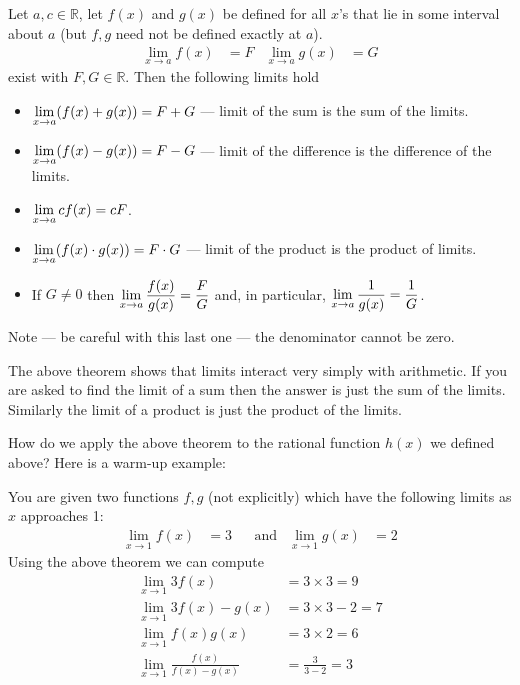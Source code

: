 \begin{theorem}\label{thm arith lim}
  Let $a,c \in \mathbb{R}$, let $f(x)$ and $g(x)$ be defined for all $x$'s that lie in
some interval about $a$ (but $f,g$ need not be defined exactly at $a$).
 \begin{align*}
  \lim_{x \to a} f(x)&=F & \lim_{x \to a} g(x) &=G
\end{align*}
  exist with $F,G \in \mathbb{R}$. Then the following limits hold
\begin{itemize}
 \item $\displaystyle \lim_{x \to a} ( f(x) + g(x) ) = F+G$ --- limit of the sum is the
sum of the limits.
 \item $\displaystyle \lim_{x \to a} ( f(x) - g(x) ) = F - G$ --- limit of the difference
is the difference of the limits.
\item $\displaystyle \lim_{x \to a} c f(x) = c F$.
\item $\displaystyle \lim_{x \to a} ( f(x) \cdot g(x) ) = F \cdot G$ --- limit of
the product is the product of limits.
\item If $G \neq 0$ then $\displaystyle \lim_{x \to a} \frac{f(x)}{g(x)} = \frac{F}{G}$
and, in particular,
             $\displaystyle \lim_{x\rightarrow a}\frac{1}{g(x)}=\frac{1}{G}$.
\end{itemize}
Note --- be careful with this last one --- the denominator cannot be zero.
\end{theorem}
The above theorem shows that limits interact very simply with arithmetic. If
you are asked to find the limit of a sum then the answer is just the sum of the
limits. Similarly the limit of a product is just the product of the limits.


How do we apply the above theorem to the rational function $h(x)$ we defined
above? Here is a warm-up example:
\begin{eg}\label{eg_1_4_1}
You are given two functions $f,g$ (not explicitly) which have the following
limits as $x$ approaches 1:
\begin{align*}
  \lim_{x \to 1} f(x)&=3 && \text{and} & \lim_{x\to 1} g(x)&=2
\end{align*}
Using the above theorem we can compute
\begin{align*}
 \lim_{x \to 1} 3f(x) &= 3 \times 3 = 9 \\
 \lim_{x \to 1} 3f(x) -g(x) &= 3\times 3 -2 = 7\\
 \lim_{x \to 1} f(x) g(x) &= 3\times 2 = 6\\
 \lim_{x \to 1} \frac{f(x)}{f(x) -g(x)} &= \frac{3}{3-2} = 3
\end{align*}
\end{eg}

